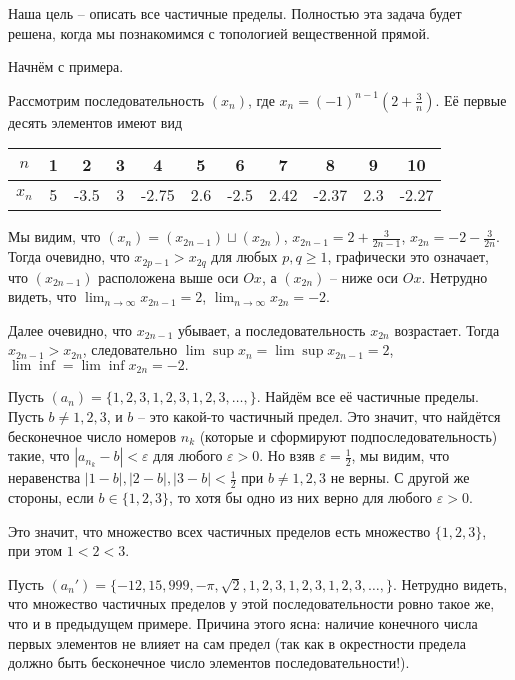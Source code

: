 Наша цель -- описать все частичные пределы. Полностью эта задача будет решена, когда мы познакомимся с топологией вещественной прямой.

Начнём с примера.

\begin{example}
 Рассмотрим последовательность $ (x_n )$, где $x_n = (-1)^{n-1}\left(2 + \frac{3}{n} \right)$. Её первые десять элементов имеют вид
     \begin{center}
      \begin{tabular}{c|c|c|c|c|c|c|c|c|c|c|}
       $n$  & 1& 2 & 3 & 4 & 5 & 6 & 7 & 8 & 9& 10 \\
       \hline
       $x_n$  & 5& -3.5  & 3 & -2.75 & 2.6 & -2.5 & 2.42 & -2.37 & 2.3 & -2.27
    \end{tabular}
     \end{center}

 Мы видим, что $ (x_n ) = (x_{2n-1} ) \sqcup (x_{2n} )$, $x_{2n-1} = 2 + \frac{3}{2n-1}$, $x_{2n} = - 2- \frac{3}{2n}$. Тогда очевидно, что $x_{2p-1} > x_{2q}$ для любых $p,q \ge 1$, \ie графически это означает, что $ (x_{2n-1} )$ расположена выше оси $Ox$, а $ (x_{2n} )$ -- ниже оси $Ox$. Нетрудно видеть, что $\lim_{n \to \infty} x_{2n-1} = 2$, $\lim_{n \to \infty} x_{2n} = -2$.

 Далее очевидно, что $x_{2n-1}$ убывает, а последовательность $x_{2n}$ возрастает. Тогда $x_{2n-1} > x_{2n}$, следовательно $\lim \sup x_n = \lim \sup x_{2n-1} = 2$, $\lim \inf = \lim \inf x_{2n} = -2.$

\end{example}

\begin{example}
    Пусть $(a_n) = \{1,2,3,1,2,3,1,2,3,\ldots,\}$. Найдём все её частичные пределы. Пусть $b \ne 1,2,3$, и $b$ -- это какой-то частичный предел. Это значит, что найдётся бесконечное число номеров $n_k$ (которые и сформируют подпоследовательность) такие, что $|a_{n_k} - b| < \varepsilon$ для любого $\varepsilon >0$. Но взяв $\varepsilon = \frac{1}{2}$, мы видим, что неравенства $|1-b|, |2-b|, |3-b| < \frac{1}{2}$ при $b \ne 1,2,3$ не верны. С другой же стороны, если $b \in \{1,2,3\}$, то хотя бы одно из них верно для любого $\varepsilon>0$.

    Это значит, что множество всех частичных пределов есть множество $\{1,2,3\}$, при этом $1<2<3.$
\end{example}

\begin{example}
    Пусть $(a_n' ) = \{-12, 15, 999, -\pi, \sqrt{2}, 1,2,3,1,2,3,1,2,3,\ldots,\}.$ Нетрудно видеть, что множество частичных пределов у этой последовательности ровно такое же, что и в предыдущем примере. Причина этого ясна: наличие конечного числа первых элементов не влияет на сам предел (так как в окрестности предела должно быть бесконечное число элементов последовательности!).
\end{example}

